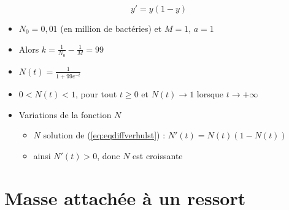 \begin{frame} 

\vspace*{-2ex}

$$y' = y(1 - y)$$

\vspace*{-2ex}


 
\pause 
\begin{itemize}
  \item $N_0 = 0,01$ (en million de bactéries) et $M=1$, $a=1$
  \pause
  \item Alors $k = \frac{1}{N_0}-\frac{1}{M} = 99$
  \pause
  \item $N(t) = \frac{1}{1 + 99 e^{-t}}$
  \pause
  \item $0<N(t)<1$, pour tout $t\ge0$ 
  \pause et  $N(t) \to 1$ lorsque $t\to+\infty$
  
  \pause
  \item Variations de la fonction $N$ 
  \begin{itemize}
  \pause
    \item $N$ solution de (\ref{eq:eqdiffverhulst}) :   $N'(t) = N(t)(1 - N(t))$
    \pause
    \item ainsi $N'(t)>0$, donc $N$ est croissante
  \end{itemize}
\end{itemize}
\pause



\end{frame}


\section*{Masse attachée à un ressort}

